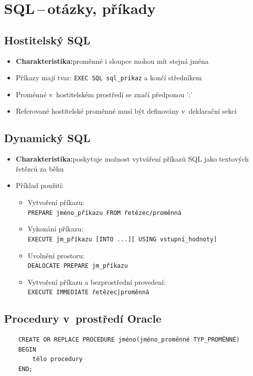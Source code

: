 \documentclass[a4paper,10pt]{article}
\newcommand{\pojem}[2]{\item \textbf{#1:}\quad #2}
\begin{document}
  \section{SQL\,--\,otázky, příkady}


    \subsection{Hostitelský SQL}
      \begin{itemize}
        \pojem{Charakteristika}{proměnné i sloupce mohou mít stejná jména}
        \item Příkazy mají tvar: \texttt{EXEC SQL sql\_prikaz} a končí středníkem
        \item Proměnné v~hostitelském prostředí se značí předponou ':'
        \item Referované hostitelské proměnné musí být definovány v~deklarační sekci
      \end{itemize}
    \subsection{Dynamický SQL}
      \begin{itemize}
        \pojem{Charakteristika}{poskytuje možnost vytváření příkazů SQL jako textových řetězců za běhu}
        \item Příklad použití:
        \begin{itemize}
          \item Vytvoření příkazu: \\ \texttt{PREPARE jméno\_příkazu FROM řetězec/proměnná}
­           \item Vykonání příkazu: \\ \texttt{EXECUTE jm\_příkazu [INTO ...][ USING vstupní\_hodnoty]}
­           \item Uvolnění prostoru: \\ \texttt{DEALOCATE PREPARE jm\_příkazu}
          \item Vytvoření příkazu a bezprostřední provedení: \\ \texttt{EXECUTE IMMEDIATE řetězec|proměnná}
        \end{itemize}
      \end{itemize}

    \subsection{Procedury v~prostředí Oracle}
    \begin{verbatim}
    CREATE OR REPLACE PROCEDURE jméno(jméno_proměnné TYP_PROMĚNNÉ)
    BEGIN
        tělo procedury
    END;
    \end{verbatim}
\end{document}
